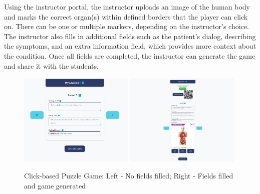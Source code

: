 Using the instructor portal, the instructor uploads an image of the human body and marks the correct organ(s) within defined borders that the player can click on. There can be one or multiple markers, depending on the instructor's choice. The instructor also fills in additional fields such as the patient’s dialog, describing the symptoms, and an extra information field, which provides more context about the condition. Once all fields are completed, the instructor can generate the game and share it with the students.

\begin{figure}
\centering
\includegraphics[width=0.49\textwidth]{figures/Diagnose_Game/Instructor_Portal_Diagnose_Game.png}
\includegraphics[width=0.49\textwidth]{figures/Diagnose_Game/Instructor_Portal_Diagnose_Game_Generated.jpeg}
\caption{Click-based Puzzle Game: Left - No fields filled; Right - Fields filled and game generated}
\label{fig:click-based-puzzle-game}
\end{figure}